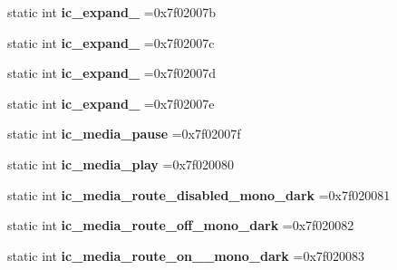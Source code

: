 \begin{DoxyCompactItemize}
static int {\bfseries ic\+\_\+expand\+\_} =0x7f02007b
\item 
\mbox{\label{classandroid_1_1support_1_1v4_1_1R_1_1drawable_a81f01997cb5a3e17bd24674a8b334669}} 
static int {\bfseries ic\+\_\+expand\+\_} =0x7f02007c
\item 
\mbox{\label{classandroid_1_1support_1_1v4_1_1R_1_1drawable_a7fbff1ab414a902018ab64dc1206e2e7}} 
static int {\bfseries ic\+\_\+expand\+\_} =0x7f02007d
\item 
\mbox{\label{classandroid_1_1support_1_1v4_1_1R_1_1drawable_ad474382c253ffd8db93ca30b120f4b5d}} 
static int {\bfseries ic\+\_\+expand\+\_} =0x7f02007e
\item 
\mbox{\label{classandroid_1_1support_1_1v4_1_1R_1_1drawable_a20c004c4e735b0e91f79a1724defe8e5}} 
static int {\bfseries ic\+\_\+media\+\_\+pause} =0x7f02007f
\item 
\mbox{\label{classandroid_1_1support_1_1v4_1_1R_1_1drawable_af48023e30e75c8460c77ffd82af65296}} 
static int {\bfseries ic\+\_\+media\+\_\+play} =0x7f020080
\item 
\mbox{\label{classandroid_1_1support_1_1v4_1_1R_1_1drawable_a54a460a62c433bd822dbfaeff02d704b}} 
static int {\bfseries ic\+\_\+media\+\_\+route\+\_\+disabled\+\_\+mono\+\_\+dark} =0x7f020081
\item 
\mbox{\label{classandroid_1_1support_1_1v4_1_1R_1_1drawable_a7c1e8451135f9371c8732a88a9bf01f1}} 
static int {\bfseries ic\+\_\+media\+\_\+route\+\_\+off\+\_\+mono\+\_\+dark} =0x7f020082
\item 
\mbox{\label{classandroid_1_1support_1_1v4_1_1R_1_1drawable_afc297746288b38ed8e1ed570a179aea6}} 
static int {\bfseries ic\+\_\+media\+\_\+route\+\_\+on\+\_\+\_\+mono\+\_\+dark} =0x7f020083
\item 
\mbox{\label{classandroid_1_1support_1_1v4_1_1R_1_1drawable_ad542d4a16dd337c02c4e357bff673e09}} 

\end{DoxyCompactItemize}
